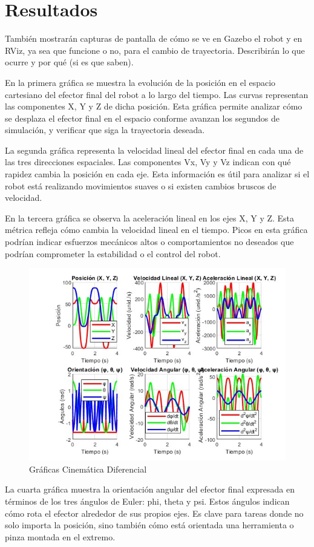 \chapter{Resultados} \label{chap:resultados}

También mostrarán capturas de pantalla de cómo se ve en Gazebo el robot y en RViz, ya sea que funcione o no, para el cambio de trayectoria. Describirán lo que ocurre y por qué (si es que saben).

En la primera gráfica se muestra la evolución de la posición en el espacio cartesiano del efector final del robot a lo largo del tiempo. Las curvas representan las componentes X, Y y Z de dicha posición. Esta gráfica permite analizar cómo se desplaza el efector final en el espacio conforme avanzan los segundos de simulación, y verificar que siga la trayectoria deseada.

La segunda gráfica representa la velocidad lineal del efector final en cada una de las tres direcciones espaciales. Las componentes Vx, Vy y Vz indican con qué rapidez cambia la posición en cada eje. Esta información es útil para analizar si el robot está realizando movimientos suaves o si existen cambios bruscos de velocidad.

En la tercera gráfica se observa la aceleración lineal en los ejes X, Y y Z. Esta métrica refleja cómo cambia la velocidad lineal en el tiempo. Picos en esta gráfica podrían indicar esfuerzos mecánicos altos o comportamientos no deseados que podrían comprometer la estabilidad o el control del robot.


\begin{figure}
	\centering
	\includegraphics[width=0.5
	\linewidth]{img/cinematicadiferencial}
	\caption{Gráficas Cinemática Diferencial}
	\label{fig:cinematicadiferencial}
\end{figure}

La cuarta gráfica muestra la orientación angular del efector final expresada en términos de los tres ángulos de Euler: phi, theta y psi. Estos ángulos indican cómo rota el efector alrededor de sus propios ejes. Es clave para tareas donde no solo importa la posición, sino también cómo está orientada una herramienta o pinza montada en el extremo.

